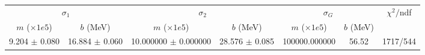 \begin{tabular}{cc|cc|cc||c}
\multicolumn{2}{c|}{$\sigma_1$} & \multicolumn{2}{|c}{$\sigma_2$} & \multicolumn{2}{|c}{$\sigma_G$}  & \multirow{2}{*}{$\chi^2/$ndf}\\
$m$ ($\times1e5$) & $b$ (MeV) & $m$ ($\times1e5$) & $b$ (MeV) & $m$ ($\times1e5$) & $b$ (MeV) & \\
\hline
9.204 $\pm$ 0.080 & 16.884 $\pm$ 0.060 & 10.000000 $\pm$ 0.000000 & 28.576 $\pm$ 0.085 & 100000.000000 & 56.52 & 1717/544\\
\end{tabular}
